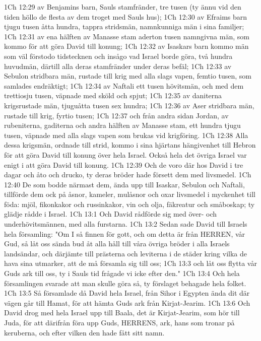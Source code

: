 1Ch 12:29  av Benjamins barn, Sauls stamfränder, tre tusen (ty ännu vid den tiden höllo de flesta av dem troget med Sauls hus);
1Ch 12:30  av Efraims barn tjugu tusen åtta hundra, tappra stridsmän, namnkunniga män i sina familjer;
1Ch 12:31  av ena hälften av Manasse stam aderton tusen namngivna män, som kommo för att göra David till konung;
1Ch 12:32  av Isaskars barn kommo män som väl förstodo tidstecknen och insågo vad Israel borde göra, två hundra huvudmän, därtill alla deras stamfränder under deras befäl;
1Ch 12:33  av Sebulon stridbara män, rustade till krig med alla slags vapen, femtio tusen, som samlades endräktigt;
1Ch 12:34  av Naftali ett tusen hövitsmän, och med dem trettiosju tusen, väpnade med sköld och spjut;
1Ch 12:35  av daniterna krigsrustade män, tjuguåtta tusen sex hundra;
1Ch 12:36  av Aser stridbara män, rustade till krig, fyrtio tusen;
1Ch 12:37  och från andra sidan Jordan, av rubeniterna, gaditerna och andra hälften av Manasse stam, ett hundra tjugu tusen, väpnade med alla slags vapen som brukas vid krigföring.
1Ch 12:38  Alla dessa krigsmän, ordnade till strid, kommo i sina hjärtans hängivenhet till Hebron för att göra David till konung över hela Israel. Också hela det övriga Israel var enigt i att göra David till konung.
1Ch 12:39  Och de voro där hos David i tre dagar och åto och drucko, ty deras bröder hade försett dem med livsmedel.
1Ch 12:40  De som bodde närmast dem, ända upp till Isaskar, Sebulon och Naftali, tillförde dem ock på åsnor, kameler, mulåsnor och oxar livsmedel i myckenhet till föda: mjöl, fikonkakor och russinkakor, vin och olja, fäkreatur och småboskap; ty glädje rådde i Israel.
1Ch 13:1  Och David rådförde sig med över- och underhövitsmännen, med alla furstarna.
1Ch 13:2  Sedan sade David till Israels hela församling: "Om I så finnen för gott, och om detta är från HERREN, vår Gud, så låt oss sända bud åt alla håll till våra övriga bröder i alla Israels landsändar, och därjämte till prästerna och leviterna i de städer kring vilka de hava sina utmarker, att de må församla sig till oss;
1Ch 13:3  och låt oss flytta vår Guds ark till oss, ty i Sauls tid frågade vi icke efter den."
1Ch 13:4  Och hela församlingen svarade att man skulle göra så, ty förslaget behagade hela folket.
1Ch 13:5  Så församlade då David hela Israel, från Sihor i Egypten ända dit där vägen går till Hamat, för att hämta Guds ark från Kirjat-Jearim.
1Ch 13:6  Och David drog med hela Israel upp till Baala, det är Kirjat-Jearim, som hör till Juda, för att därifrån föra upp Guds, HERRENS, ark, hans som tronar på keruberna, och efter vilken den hade fått sitt namn.
